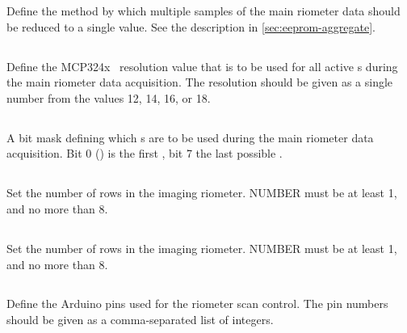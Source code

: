 Define the method by which multiple samples of the main riometer data
should be reduced to a single value. See the description in
\ref{sec:eeprom-aggregate}.

\subsection[rio-riometer-adc-resolution]{}

Define the MCP324x \adc\ resolution value that is to be used for all
active \adc s during the main riometer data acquisition. The
resolution should be given as a single number from the values 12, 14,
16, or 18.



\subsection[rio-riometer-adc-mask]{}

A bit mask defining which \adc s are to be used during the main
riometer data acquisition. Bit 0 (\lsb) is the first \adc, bit 7 the
last possible \adc.

\subsection[rio-num-rows]{}

Set the number of rows in the imaging riometer. NUMBER must be at
least 1, and no more than 8.

\subsection[rio-num-columns]{}

Set the number of rows in the imaging riometer. NUMBER must be at
least 1, and no more than 8.

\subsection[rio-scan-pins]{}
\label{sec:eeprom-rio-scan-pins}

Define the Arduino pins used for the riometer scan control. The pin numbers
should be given as a comma-separated list of integers.

